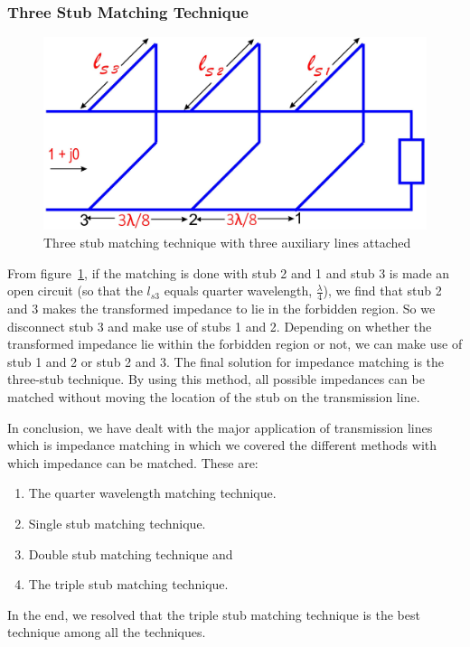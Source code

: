 \subsubsection{Three Stub Matching Technique}
\begin{figure}[h]
\centering
\includegraphics[width=1\linewidth]{./graphics/fig13}
\caption{Three stub matching technique with three auxiliary lines attached}
\label{fig:fig13}
\end{figure}

From figure~\ref{fig:fig13}, if the matching is done with stub 2 and 1 and stub 3 is made an open circuit (so that the $ l_{s3}$ equals quarter wavelength, $\frac{\lambda}{4}$), we find that stub 2 and 3 makes the transformed impedance to lie in the forbidden region. So we disconnect stub 3 and make use of stubs 1 and 2. Depending on whether the transformed impedance lie within the forbidden region or not, we can make use of stub 1 and 2 or stub 2 and 3. The final solution for impedance matching is the three-stub technique. By using this method, all possible impedances can be matched without moving the location of the stub on the transmission line.

In conclusion, we have dealt with the major application of transmission lines which is impedance matching in which we covered the different methods with which impedance can be matched. These are:
\begin{enumerate}
\item The quarter wavelength matching technique.
\item Single stub matching technique.
\item Double stub matching technique and
\item The triple stub matching technique.
\end{enumerate}

In the end, we resolved that the triple stub matching technique is the best technique among all the techniques.

